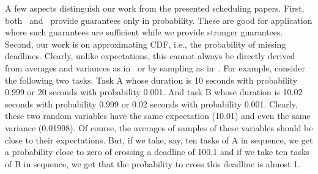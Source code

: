 \documentclass[review]{elsarticle}
\begin{document}
A few aspects distinguish our work from the presented scheduling papers. First, both~\cite{fu2010towards} and~\cite{bonfietti2014disregarding} provide guarantees only in probability. These are good for application where such guarantees are sufficient while we provide stronger guarantees. Second, our work is on approximating CDF, i.e., the probability of missing deadlines. Clearly, unlike expectations, this cannot always be directly derived from averages and variances as in~\cite{bonfietti2014disregarding} or by sampling as in~\cite{beck2007proactive}. 
For example, consider the following two tasks. Task A whose duration is 10 seconds with probability 0.999 or 20 seconds with probability 0.001. And task B whose duration is 10.02 seconds with probability 0.999 or 0.02 seconds with probability 0.001. Clearly, these two random variables have the same expectation (10.01) and even the same variance (0.01998). Of course, the averages of samples of these variables should be close to their expectations. But, if we take, say, ten tasks of A in sequence, we get a probability close to zero of crossing a deadline of 100.1 and if we take ten tasks of B in sequence, we get that the probability to cross this deadline is almost 1.
\end{document}
